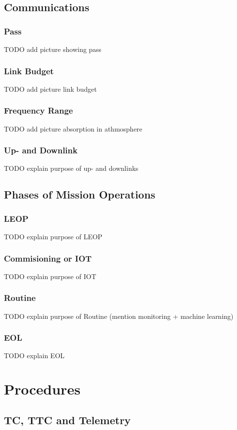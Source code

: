 \documentclass[12pt,utf8,notheorems,compress]{beamer}
\begin{document}
\subsection{Communications}

\begin{frame}
  \frametitle{Pass}
  \pause
  TODO add picture showing pass
\end{frame}

\begin{frame}
  \frametitle{Link Budget}
  \pause
  TODO add picture link budget
\end{frame}

\begin{frame}
  \frametitle{Frequency Range}
  \pause
  TODO add picture absorption in athmosphere
\end{frame}

\begin{frame}
  \frametitle{Up- and Downlink}
  \pause
  TODO explain purpose of up- and downlinks
\end{frame}

\subsection{Phases of Mission Operations}

\begin{frame}
  \frametitle{LEOP}
  \pause
  TODO explain purpose of LEOP
\end{frame}

\begin{frame}
  \frametitle{Commisioning or IOT}
  \pause
  TODO explain purpose of IOT
\end{frame}

\begin{frame}
  \frametitle{Routine}
  \pause
  TODO explain purpose of Routine (mention monitoring + machine learning)
\end{frame}

\begin{frame}
  \frametitle{EOL}
  \pause
  TODO explain EOL
\end{frame}

\section{Procedures}

\subsection{TC, TTC and Telemetry}
\end{document}
